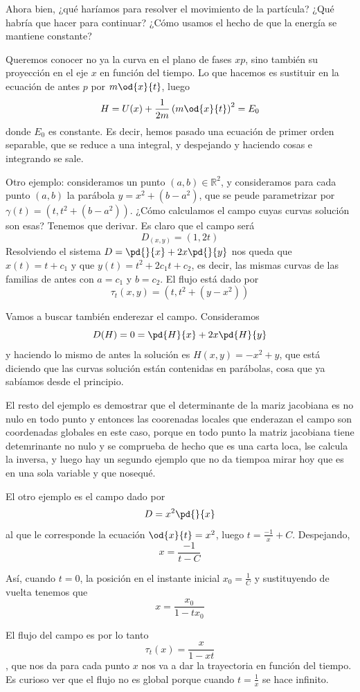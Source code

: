 Ahora bien, ¿qué haríamos para resolver el movimiento de la partícula? ¿Qué habría que hacer para continuar? ¿Cómo usamos el hecho de que la energía se mantiene constante?

Queremos conocer no ya la curva en el plano de fases $xp$, sino también su proyección en el eje $x$ en función del tiempo. Lo que hacemos es sustituir en la ecuación de antes $p$ por $m\od{x}{t}$, luego \[ H = U(x) + \frac{1}{2m}\left(m\od{x}{t}\right)^2 = E_0 \] donde $E_0$ es constante. Es decir, hemos pasado una ecuación de primer orden separable, que se reduce a una integral, y despejando y haciendo cosas e integrando se sale.

Otro ejemplo: consideramos un punto $(a,b) ∈ ℝ^2$, y consideramos para cada punto $(a,b)$ la parábola $y = x^2 + (b-a^2)$, que se peude parametrizar por $γ(t) = (t, t^2 + (b-a^2))$. ¿Cómo calculamos el campo cuyas curvas solución son esas? Tenemos que derivar. Es claro que el campo será \[ D_{(x,y)} = (1,2t) \] Resolviendo el sistema $D = \pd{}{x} + 2x \pd{}{y}$ nos queda que $x(t) = t +c_1$ y que $y(t) = t^2 + 2c_1 t + c_2$, es decir, las mismas curvas de las familias de antes con $a = c_1$ y $b =c_2$. El flujo está dado por \[ τ_t(x,y) = (t, t^2 + (y-x^2))\]

Vamos a buscar también enderezar el campo. Consideramos \[ D(H) = 0 = \pd{H}{x} + 2x \pd{H}{y} \] y haciendo lo mismo de antes la solución es $H(x,y) = -x^2 + y$, que está diciendo que las curvas solución están contenidas en parábolas, cosa que ya sabíamos desde el principio.

El resto del ejemplo es demostrar que el determinante de la mariz jacobiana es no nulo en todo punto y entonces las coorenadas locales que enderazan el campo son coordenadas globales en este caso, porque en todo punto la matriz jacobiana tiene detemrinante no nulo y se comprueba de hecho que es una carta loca, lse calcula la inversa, y luego hay un segundo ejemplo que no da tiempoa mirar hoy que es en una sola variable y que nosequé.

El otro ejemplo es el campo dado por \[ D = x^2 \pd{}{x} \] al que le corresponde la ecuación $\od{x}{t} = x^2$, luego $t = \frac{-1}{x} + C$. Despejando, \[ x = \frac{-1}{t-C} \]

Así, cuando $t = 0$, la posición en el instante inicial $x_0 = \frac{1}{C}$ y sustituyendo de vuelta tenemos que \[ x = \frac{x_0}{1-tx_0} \]

El flujo del campo es por lo tanto \[ τ_t(x) = \frac{x}{1-xt} \], que nos da para cada punto $x$ nos va a dar la trayectoria en función del tiempo. Es curioso ver que el flujo no es global porque cuando $t = \frac{1}{x}$ se hace infinito.

